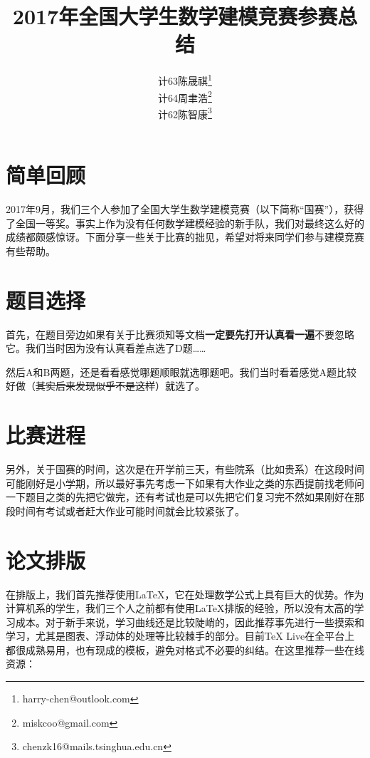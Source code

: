 \documentclass{ctexart}
\newcommand{\arttitle}{2017年全国大学生数学建模竞赛参赛总结}
\begin{document}
\title{\bfseries{\arttitle}}
\author{
	计63\hspace{1em}陈晟祺\thanks{harry-chen@outlook.com}\\
    计64\hspace{1em}周聿浩\thanks{miskcoo@gmail.com}\\
    计62\hspace{1em}陈智康\thanks{chenzk16@mails.tsinghua.edu.cn}
}
\date{}
\maketitle

\section{简单回顾}
2017年9月，我们三个人参加了全国大学生数学建模竞赛（以下简称“国赛”），获得了全国一等奖。事实上作为没有任何数学建模经验的新手队，我们对最终这么好的成绩都颇感惊讶。下面分享一些关于比赛的拙见，希望对将来同学们参与建模竞赛有些帮助。

\section{题目选择}
首先，在题目旁边如果有关于比赛须知等文档{\bf 一定要先打开认真看一遍}不要忽略它。我们当时因为没有认真看差点选了D题……

然后A和B两题，还是看看感觉哪题顺眼就选哪题吧。我们当时看着感觉A题比较好做（\sout{其实后来发现似乎不是这样}）就选了。

\section{比赛进程}


另外，关于国赛的时间，这次是在开学前三天，有些院系（比如贵系）在这段时间可能刚好是小学期，所以最好事先考虑一下如果有大作业之类的东西提前找老师问一下题目之类的先把它做完，还有考试也是可以先把它们复习完不然如果刚好在那段时间有考试或者赶大作业可能时间就会比较紧张了。

\section{论文排版}
在排版上，我们首先推荐使用\LaTeX{}，它在处理数学公式上具有巨大的优势。作为计算机系的学生，我们三个人之前都有使用\LaTeX{}排版的经验，所以没有太高的学习成本。对于新手来说，学习曲线还是比较陡峭的，因此推荐事先进行一些摸索和学习，尤其是图表、浮动体的处理等比较棘手的部分。目前\TeX{} Live在全平台上都很成熟易用，也有现成的模板，避免对格式不必要的纠结。在这里推荐一些在线资源：
\end{document}
